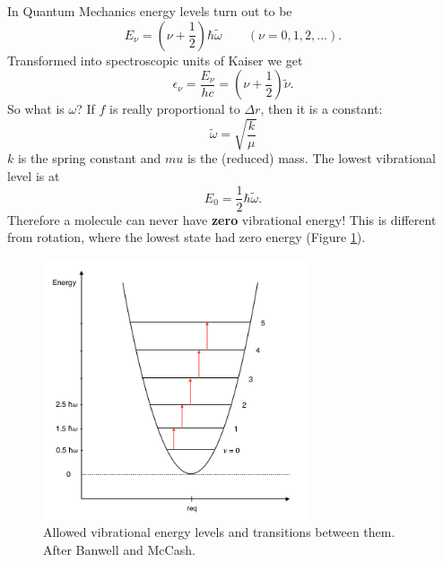 In Quantum Mechanics energy levels turn out to be 
\begin{equation}
E_\nu = (\nu+\frac{1}{2})\hbar\tilde{\omega} \qquad (\nu = 0, 1, 2, ...).
\end{equation}
Transformed into spectroscopic units of Kaiser we get
\begin{equation}
\epsilon_\nu = \frac{E_\nu}{hc} = (\nu + \frac{1}{2})\tilde{\nu}.
\end{equation}
So what is $\omega$? If $f$ is really proportional to $\Delta r$, then it is a constant:
\begin{equation}
\tilde{\omega} = \sqrt{\frac{k}{\mu}}
\end{equation}
$k$ is the spring constant and $mu$ is the (reduced) mass.
The lowest vibrational level is at
\begin{equation}
E_0 = \frac{1}{2} \hbar \tilde{\omega}.
\end{equation}
Therefore a molecule can never have \textbf{zero} vibrational energy! This is different from rotation, where the lowest state had zero energy (Figure \ref{Vibration_parabol_2}). \par

\begin{figure}
\begin{center}
\includegraphics[width=0.7\textwidth]{figures/Vibration_parabol_2}
\caption{Allowed vibrational energy levels and transitions between them. After Banwell and McCash.}
\label{Vibration_parabol_2}
\end{center}
\end{figure}

